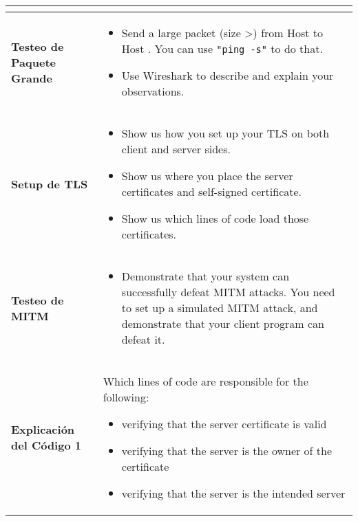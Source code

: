 \begin{longtable}{|p{}|p{}|}
\begin{itemize}[topsep=-0.5cm,leftmargin=0.4cm]
	\end{itemize}
 \\ 
 \hline

 \textbf{Testeo de Paquete Grande} & 
 	\vspace*{-0.3cm}
 	\begin{itemize}[topsep=-0.5cm,leftmargin=0.4cm]
	\item Send a large packet (size \textgreater\space 3000) from Host \hostu to Host \hostv. 
	You can use \texttt{"ping -s"} to do that. 

	\item Use Wireshark to describe and explain your observations.
	\end{itemize}
 \\ 
 \hline

 \textbf{Setup de TLS} & 
 	\vspace*{-0.3cm}
 	\begin{itemize}[topsep=-0.5cm,leftmargin=0.4cm]
		\item Show us how you set up your TLS on both client and server sides.
		\item Show us where you place the server certificates and self-signed certificate.
		\item Show us which lines of code load those certificates.
	\end{itemize}
 \\ 
 \hline

 \textbf{Testeo de MITM} & 
 	\vspace*{-0.3cm}
 	\begin{itemize}[topsep=-0.5cm,leftmargin=0.4cm]
		\item Demonstrate that your system can successfully defeat MITM attacks. You
		need to set up a simulated MITM attack, and demonstrate that your client
		program can defeat it.
	\end{itemize}
 \\ 
 \hline

 \textbf{Explicación del Código 1} & 
	Which lines of code are responsible for the following:
 	\vspace*{0.2cm}
 	\begin{itemize}[topsep=-0.5cm,leftmargin=0.4cm]
		\item verifying that the server certificate is valid
		\item verifying that the server is the owner of the certificate
		\item verifying that the server is the intended server
	\end{itemize}
 \\ 
 \hline


\end{longtable}
